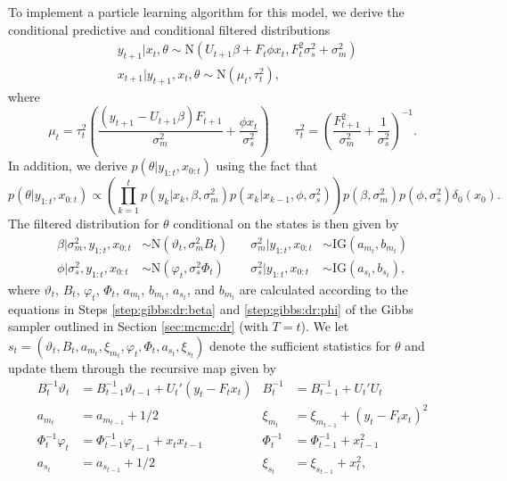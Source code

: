 To implement a particle learning algorithm for this model, we derive the conditional predictive and conditional filtered distributions
\begin{align}
&y_{t+1}|x_t,\theta \sim \mbox{N}(U_{t+1}\beta + F_t\phi x_t, F_t^2\sigma^2_s + \sigma^2_m) \label{eqn:pl:dr:pred} \\
&x_{t+1}|y_{t+1},x_t,\theta \sim \mbox{N}(\mu_t,\tau_t^2), \label{eqn:pl:dr:state}
\end{align}
where \[\mu_t = \tau_t^2\left(\frac{(y_{t+1}-U_{t+1}\beta)F_{t+1}}{\sigma^2_m} + \frac{\phi x_t}{\sigma^2_s}\right) \qquad \tau_t^2 = \left(\frac{F_{t+1}^2}{\sigma^2_m} + \frac{1}{\sigma^2_s}\right)^{-1}.\]
In addition, we derive $p(\theta|y_{1:t},x_{0:t})$ using the fact that
\begin{equation}
p(\theta|y_{1:t},x_{0:t}) \propto \left(\prod_{k=1}^t p(y_k|x_k,\beta,\sigma^2_m)p(x_k|x_{k-1},\phi,\sigma^2_s)\right)p(\beta,\sigma^2_m)p(\phi,\sigma^2_s)\delta_0(x_0). \label{eqn:pl:dr:theta}
\end{equation}
The filtered distribution for $\theta$ conditional on the states is then given by
\begin{align}
\beta|\sigma^2_m,y_{1:t},x_{0:t} &\sim \mbox{N}(\vartheta_t, \sigma^2_m B_t) &\quad \sigma^2_m|y_{1:t},x_{0:t} &\sim \mbox{IG}(a_{m_t},b_{m_t}) \label{eqn:pl:post:beta} \\
\phi|\sigma^2_s,y_{1:t},x_{0:t} &\sim \mbox{N}(\varphi_t, \sigma^2_s \Phi_t) &\quad \sigma^2_s|y_{1:t},x_{0:t} &\sim \mbox{IG}(a_{s_t},b_{s_t}), \label{eqn:pl:post:phi}
\end{align}
where $\vartheta_t$, $B_t$, $\varphi_t$, $\Phi_t$, $a_{m_t}$, $b_{m_t}$, $a_{s_t}$, and $b_{m_t}$ are calculated according to the equations in Steps \ref{step:gibbs:dr:beta} and \ref{step:gibbs:dr:phi} of the Gibbs sampler outlined in Section \ref{sec:mcmc:dr} (with $T = t$). We let $s_t = (\vartheta_t, B_t, a_{m_t}, \xi_{m_t}, \varphi_t, \Phi_t, a_{s_t}, \xi_{s_t})$ denote the sufficient statistics for $\theta$ and update them through the recursive map given by
\begin{align}
B_t^{-1}\vartheta_t &= B_{t-1}^{-1}\vartheta_{t-1} + U_t'(y_t - F_tx_t) & B_t^{-1} &= B_{t-1}^{-1} + U_t'U_t \label{eqn:pl:dr:suff} \\
a_{m_t} &= a_{m_{t-1}} + 1/2 & \xi_{m_t} &= \xi_{m_{t-1}} + (y_t - F_tx_t)^2 \nonumber \\
\Phi_t^{-1}\varphi_t &= \Phi_{t-1}^{-1}\varphi_{t-1} + x_tx_{t-1} & \Phi_t^{-1} &= \Phi_{t-1}^{-1} + x_{t-1}^2 \nonumber \\
a_{s_t} &= a_{s_{t-1}} + 1/2 & \xi_{s_t} &= \xi_{s_{t-1}} + x_t^2, \nonumber
\end{align}
